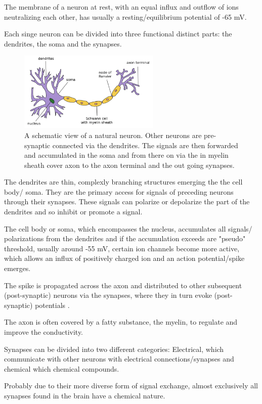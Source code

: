 The membrane of a neuron at rest, with an equal influx and outflow of ions neutralizing each other, has usually a resting/equilibrium potential of -65 mV. 

Each singe neuron can be divided into three functional distinct parts: the dendrites, the soma and the synapses.

\begin{figure}
	\centering
    	\includegraphics[width=0.6\textwidth]{imgs/neuron.png} 
    \caption{A schematic view of a natural neuron. Other neurons are pre-synaptic connected via the dendrites. The signals are then forwarded and accumulated in the soma and from there on via the in myelin sheath cover axon to the axon terminal and the out going synapses.}
	\label{fig:neurpn}
\end{figure}

The dendrites are thin, complexly branching structures emerging the the cell body/ soma.
They are the primary access for signals of preceding neurons through their synapses. 
These signals can polarize or depolarize the part of the dendrites and so inhibit or promote a signal. 

The cell body or soma, which encompasses the nucleus, accumulates all signals/ polarizations from the dendrites and if the accumulation exceeds are "pseudo" threshold, usually around -55 mV, certain ion channels become more active, which allows an influx of positively charged ion and an action potential/spike emerges.

The spike is propagated across the axon and distributed to other subsequent (post-synaptic) neurons via the synapses, where they in turn evoke (post-synaptic) potentials .

The axon is often covered by a fatty substance, the myelin, to regulate and improve the conductivity.

Synapses can be divided into two different categories: Electrical, which communicate with other neurons with electrical connections/synapses and chemical which chemical compounds.

Probably due to their more diverse form of signal exchange, almost exclusively all synapses found in the brain have a chemical nature.

